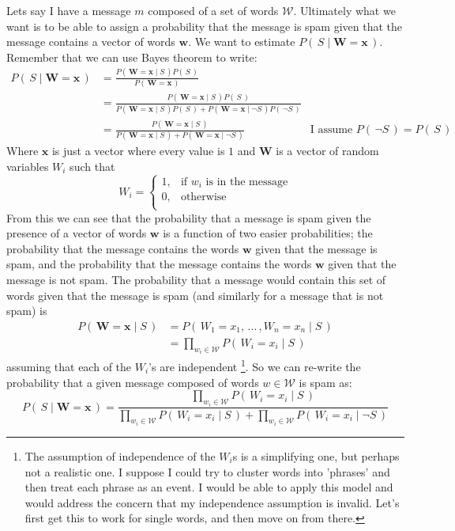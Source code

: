 \documentclass[11pt, oneside]{article}   	%
\newcommand{\ffrac}[2]{\ensuremath{\frac{\displaystyle #1}{\displaystyle #2}}}
\begin{document}
Lets say I have a message $m$ composed of a set of words \(\mathcal{W}\). Ultimately what we want is to be able to assign a probability that the message is spam given that the message contains a vector of words $\bm{w}$. We want to estimate $P(\,S \mid \bm{W} = \bm{x}\,)$. Remember that we can use Bayes theorem to write:
\begin{align*}
P(\,S\mid \bm{W}=\bm{x}\,) &= \frac 
	{P(\,\bm{W}=\bm{x} \mid S\,)P(\,S\,)} 
	{P(\,\bm{W}=\bm{x}\,)} \\
	&= \frac
	{P(\,\bm{W}=\bm{x} \mid S\,)P(\,S\,)} 
	{P(\,\bm{W}=\bm{x} \mid S\,)P(\,S\,) + P(\,\bm{W}=\bm{x} \mid \neg S\,)P(\,\neg S\,)}  \\
	&= \frac
	{P(\,\bm{W}=\bm{x} \mid S\,)} 
	{P(\,\bm{W}=\bm{x} \mid S\,) + P(\,\bm{W}=\bm{x} \mid \neg S\,)} & \text{I assume } P(\,\neg S\,) = P(\,S\,)
\end{align*}
Where $\bm{x}$ is just a vector where every value is $1$ and $\bm{W}$ is a vector of random variables $W_i$ such that
\[
W_i= \begin{cases}
1, & \text{if } w_i \text{ is in the message} \\
0,  & \text{otherwise} \\
\end{cases}
\]
From this we can see that the probability that a message is spam given the presence of a vector of words $\bm{w}$ is a function of two easier probabilities; the probability that the message contains the words $\bm{w}$ given that the message is spam, and the probability that the message contains the words $\bm{w}$ given that the message is not spam. The probability that a message would contain this set of words given that the message is spam (and similarly for a message that is not spam) is 
\begin{align*}
P(\,\bm{W}=\bm{x} \mid S \,) &= P(\,W_1 = x_1,\, \ldots \,, W_n = x_n \mid S \,) \\
&= \prod_{w_i \in \mathcal{W}}P(\,W_i=x_i\mid S\,)
\end{align*}
 assuming that each of the \(W_i\)'s are independent \footnote{The assumption of independence of the \(W_i \)s is a simplifying one, but perhaps not a realistic one. I suppose I could try to cluster words into 'phrases' and then treat each phrase as an event. I would be able to apply this model and would address the concern that my independence assumption is invalid. Let's first get this to work for single words, and then move on from there.}. So we can re-write the probability that a given message composed of words $w \in \mathcal{W}$ is spam as:
\begin{equation}
P(\,S\mid \bm{W}=\bm{x}\,) = \ffrac
	{ \prod_{w_i \in \mathcal{W}} P(\,W_i=x_i \mid S\,)}
	{ \prod_{w_i \in \mathcal{W}} P(\,W_i=x_i \mid S\,) + \prod_{w_i \in \mathcal{W}} P(\,W_i=x_i \mid \neg S\,)}
\end{equation}
\end{document}
